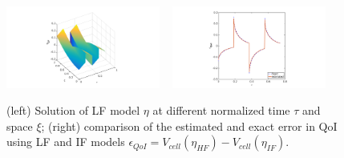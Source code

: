 \documentclass[]{article}
\begin{document}

\begin{figure}[h]
    \centering
    \includegraphics[trim = 5in 0in 5in 0in, clip, width=0.45\textwidth]{etaLF.png}
    ~
    \includegraphics[trim = 4in 0in 4in 0in, clip, width=0.45\textwidth]{E_qoi.png}       
    \caption{(left) Solution of LF model $\eta$ at different normalized time $\tau$ and space $\xi$; (right) comparison of the estimated and exact error in QoI using LF and IF models $\epsilon_{QoI}=V_{cell}(\eta_{HF})-V_{cell}(\eta_{IF})$.}
    \label{fig:cycl}
\end{figure}
\end{document}
